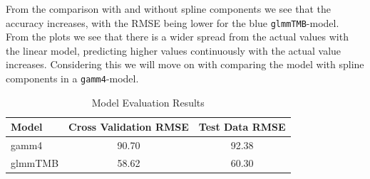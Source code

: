 \documentclass[12pt, twoside,hidelinks]{article}
\theoremstyle{definition}
\numberwithin{equation}{section}
\begin{document}
From the comparison with and without spline components we see that the accuracy increases, with the RMSE being lower for the blue \texttt{glmmTMB}-model. From the plots we see that there is a wider spread from the actual values with the linear model, predicting higher values continuously with the actual value increases. Considering this we will move on with comparing the model with spline components in a \texttt{gamm4}-model.




\begin{table}[H]
\centering
\caption{Model Evaluation Results}
\label{table:model_evaluationmort}
\begin{tabular}{lcc}
\hline
\textbf{Model} & \textbf{Cross Validation RMSE} & \textbf{Test Data RMSE} \\
\hline
gamm4 &  90.70  & 92.38 \\
glmmTMB & 58.62 & 60.30 \\
\hline
\end{tabular}
\end{table}
\end{document}
